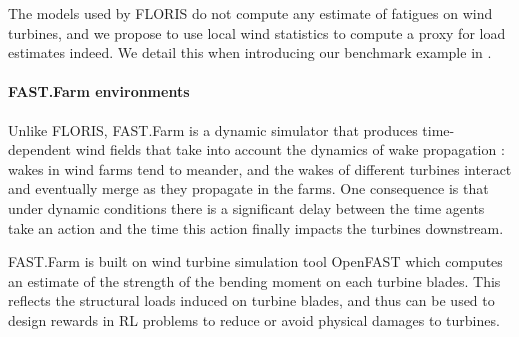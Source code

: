 \documentclass{article}
\newcommand{\jz}[1]{{\color{blue}#1}}
\newcommand{\md}[1]{{\color{red}#1}}
\begin{document}
The models used by FLORIS do not compute any estimate of fatigues on wind turbines, and we propose to use local wind statistics to compute a proxy for load estimates indeed. We detail this when introducing our benchmark example in . 
%
%
%
%
%
\paragraph{FAST.Farm environments}
Unlike FLORIS, FAST.Farm is a dynamic simulator that produces time-dependent wind fields that take into account the dynamics of wake propagation \cite{fast.farm}: wakes in wind farms tend to meander, and the wakes of different turbines interact and eventually merge as they propagate in the farms. One consequence is that under dynamic conditions there is a significant delay between the time agents take an action and the time this action finally impacts the turbines downstream.
%

FAST.Farm is built on wind turbine simulation tool OpenFAST \cite{openfast} which computes an estimate of the strength of the bending moment on each turbine blades. This reflects the structural loads induced on turbine blades, and thus can be used to design rewards in RL problems to reduce or avoid physical damages to turbines.
%
\end{document}
